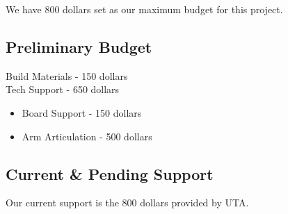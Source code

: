 We have 800 dollars set as our maximum budget for this project.

\subsection{Preliminary Budget}
Build Materials - 150 dollars \\
Tech Support - 650 dollars
\begin{itemize}
    \item Board Support - 150 dollars
    \item Arm Articulation - 500 dollars
\end{itemize}

\subsection{Current \& Pending Support}
Our current support is the 800 dollars provided by UTA.


